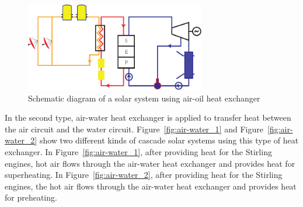 \begin{figure}[h]
\centering 
\includegraphics[width=0.7\textwidth]{fig/air-oil}
\caption{Schematic diagram of a solar system using air-oil heat exchanger}\label{fig:air-oil}
\end{figure}

In the second type, air-water heat exchanger is applied to transfer heat between the air circuit and the water circuit. Figure~\ref{fig:air-water_1} and Figure~\ref{fig:air-water_2} show two different kinds of cascade solar systems using this type of heat exchanger. In Figure~\ref{fig:air-water_1}, after providing heat for the Stirling engines, hot air flows through the air-water heat exchanger and provides heat for superheating. In Figure~\ref{fig:air-water_2}, after providing heat for the Stirling engines, the hot air flows through the air-water heat exchanger and provides heat for preheating. 

